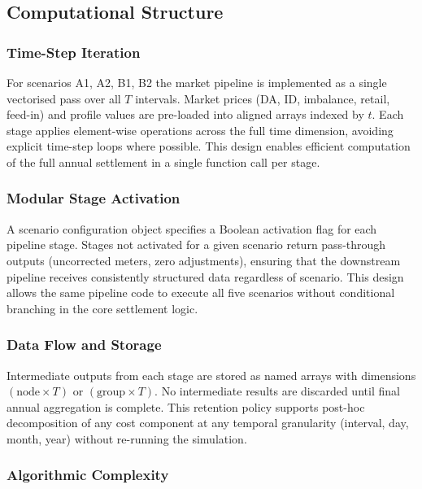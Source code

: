 \documentclass[12pt,a4paper]{article}
\begin{document}
\subsection{Computational Structure}
\label{subsec:computation}

\subsubsection{Time-Step Iteration}

For scenarios A1, A2, B1, B2 the market pipeline is implemented as a single
vectorised pass over all $T$ intervals.  Market prices (DA, ID, imbalance,
retail, feed-in) and profile values are pre-loaded into aligned arrays indexed
by $t$.  Each stage applies element-wise operations across the full time
dimension, avoiding explicit time-step loops where possible.  This design
enables efficient computation of the full annual settlement in a single
function call per stage.

\subsubsection{Modular Stage Activation}

A scenario configuration object specifies a Boolean activation flag for each
pipeline stage.  Stages not activated for a given scenario return
pass-through outputs (uncorrected meters, zero adjustments), ensuring that
the downstream pipeline receives consistently structured data regardless of
scenario.  This design allows the same pipeline code to execute all five
scenarios without conditional branching in the core settlement logic.

\subsubsection{Data Flow and Storage}

Intermediate outputs from each stage are stored as named arrays with
dimensions $(\text{node} \times T)$ or $(\text{group} \times T)$.  No
intermediate results are discarded until final annual aggregation is complete.
This retention policy supports post-hoc decomposition of any cost component
at any temporal granularity (interval, day, month, year) without re-running
the simulation.

\subsubsection{Algorithmic Complexity}
\end{document}
